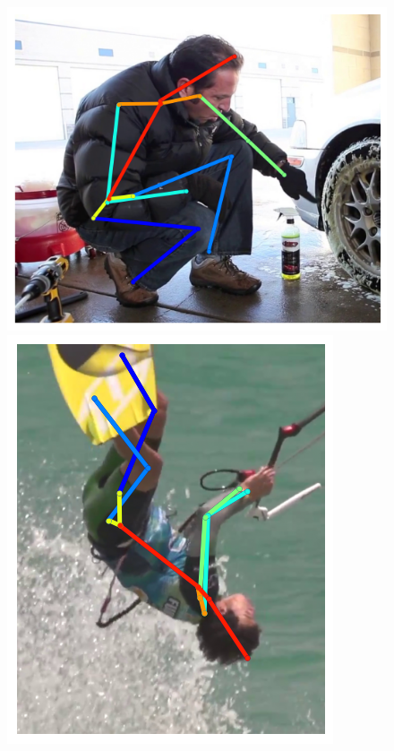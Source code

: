 \begin{figure}[t!]
    \centering
    \newcommand{\flowh}{0.28\columnwidth}
    \includegraphics[height=\flowh]{resources/Human_Poses/pose/qualitative/pred-1}
    \hfill
    \includegraphics[height=\flowh]{resources/Human_Poses/pose/qualitative/pred-2}
    \hfill

\end{figure}
